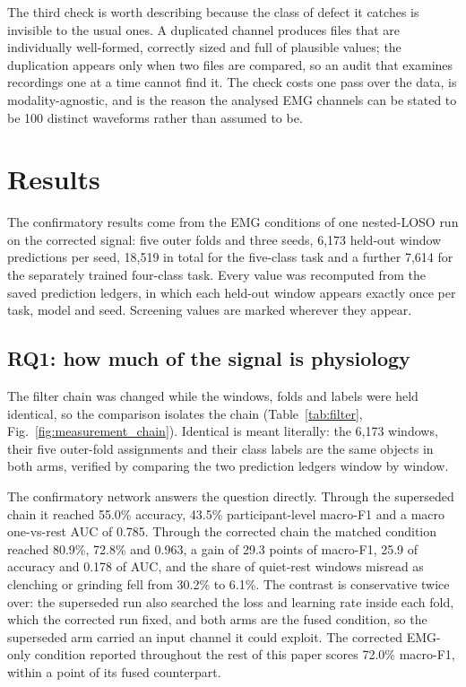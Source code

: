 \documentclass[pdflatex,sn-nature,iicol]{sn-jnl}
\begin{document}
The third check is worth describing because the class of defect it catches is invisible to the usual ones. A duplicated channel produces files that are individually well-formed, correctly sized and full of plausible values; the duplication appears only when two files are compared, so an audit that examines recordings one at a time cannot find it. The check costs one pass over the data, is modality-agnostic, and is the reason the analysed EMG channels can be stated to be 100 distinct waveforms rather than assumed to be.

\section{Results}

The confirmatory results come from the EMG conditions of one nested-LOSO run on the corrected signal: five outer folds and three seeds, 6,173 held-out window predictions per seed, 18,519 in total for the five-class task and a further 7,614 for the separately trained four-class task. Every value was recomputed from the saved prediction ledgers, in which each held-out window appears exactly once per task, model and seed. Screening values are marked wherever they appear.

\subsection{RQ1: how much of the signal is physiology}
\label{sec:rq1}

The filter chain was changed while the windows, folds and labels were held identical, so the comparison isolates the chain (Table~\ref{tab:filter}, Fig.~\ref{fig:measurement_chain}). Identical is meant literally: the 6,173 windows, their five outer-fold assignments and their class labels are the same objects in both arms, verified by comparing the two prediction ledgers window by window.

The confirmatory network answers the question directly. Through the superseded chain it reached 55.0\% accuracy, 43.5\% participant-level macro-F1 and a macro one-vs-rest AUC of 0.785. Through the corrected chain the matched condition reached 80.9\%, 72.8\% and 0.963, a gain of 29.3 points of macro-F1, 25.9 of accuracy and 0.178 of AUC, and the share of quiet-rest windows misread as clenching or grinding fell from 30.2\% to 6.1\%. The contrast is conservative twice over: the superseded run also searched the loss and learning rate inside each fold, which the corrected run fixed, and both arms are the fused condition, so the superseded arm carried an input channel it could exploit. The corrected EMG-only condition reported throughout the rest of this paper scores 72.0\% macro-F1, within a point of its fused counterpart.
\end{document}
